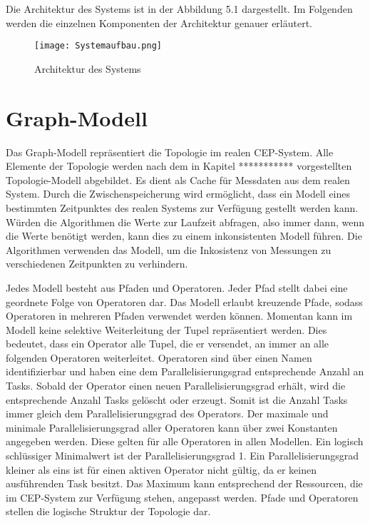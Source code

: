 Die Architektur des Systems ist in der Abbildung 5.1 dargestellt.
Im Folgenden werden die einzelnen Komponenten der Architektur genauer erläutert.

\begin{figure}
  \centering
  \texttt{[image: Systemaufbau.png]}
  \caption{Architektur des Systems}
  \label{fig:Architektur}
\end{figure}

\section{Graph-Modell}
Das Graph-Modell repräsentiert die Topologie im realen CEP-System.
Alle Elemente der Topologie werden nach dem in Kapitel *********** vorgestellten Topologie-Modell abgebildet.
Es dient als Cache für Messdaten aus dem realen System.
Durch die Zwischenspeicherung wird ermöglicht, dass ein Modell eines bestimmten Zeitpunktes des realen Systems zur Verfügung gestellt werden kann. 
Würden die Algorithmen die Werte zur Laufzeit abfragen, also immer dann, wenn die Werte benötigt werden, kann dies zu einem inkonsistenten Modell führen.
Die Algorithmen verwenden das Modell, um die Inkosistenz von Messungen zu verschiedenen Zeitpunkten zu verhindern.

Jedes Modell besteht aus Pfaden und Operatoren.
Jeder Pfad stellt dabei eine geordnete Folge von Operatoren dar.
Das Modell erlaubt kreuzende Pfade, sodass Operatoren in mehreren Pfaden verwendet werden können.
Momentan kann im Modell keine selektive Weiterleitung der Tupel repräsentiert werden.
Dies bedeutet, dass ein Operator alle Tupel, die er versendet, an immer an alle folgenden Operatoren weiterleitet.
Operatoren sind über einen Namen identifizierbar und haben eine dem Parallelisierungsgrad entsprechende Anzahl an Tasks.
Sobald der Operator einen neuen Parallelisierungsgrad erhält, wird die entsprechende Anzahl Tasks gelöscht oder erzeugt.
Somit ist die Anzahl Tasks immer gleich dem Parallelisierungsgrad des Operators.
Der maximale und minimale Parallelisierungsgrad aller Operatoren kann über zwei Konstanten angegeben werden. 
Diese gelten für alle Operatoren in allen Modellen. 
Ein logisch schlüssiger Minimalwert ist der Parallelisierungsgrad 1.
Ein Parallelisierungsgrad kleiner als eins ist für einen aktiven Operator nicht gültig, da er keinen ausführenden Task besitzt.
Das Maximum kann entsprechend der Ressourcen, die im CEP-System zur Verfügung stehen, angepasst werden.
Pfade und Operatoren stellen die logische Struktur der Topologie dar.

